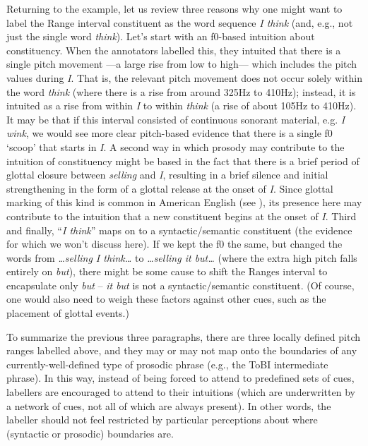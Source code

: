 \documentclass[11pt, twoside]{memoir}
\def\langtext#1{\textit{#1}}
\begin{document}
Returning to the example, let us review three reasons why one might want to label the Range interval constituent as the word sequence \langtext{I think} (and, e.g., not just the single word \langtext{think}). Let’s start with an f0-based intuition about constituency. When the annotators labelled this, they intuited that there is a single pitch movement —a large rise from low to high— which includes the pitch values during \langtext{I}. That is, the relevant pitch movement does not occur solely within the word \langtext{think} (where there is a rise from around 325Hz to 410Hz); instead, it is intuited as a rise from within \langtext{I} to within \langtext{think} (a rise of about 105Hz to 410Hz). It may be that if this interval consisted of continuous sonorant material, e.g. \langtext{I wink}, we would see more clear pitch-based evidence that there is a single f0 ‘scoop’ that starts in \langtext{I}. A second way in which prosody may contribute to the intuition of constituency might be based in the fact that there is a brief period of glottal closure between \langtext{selling} and \langtext{I}, resulting in a brief silence and initial strengthening in the form of a glottal release at the onset of \langtext{I}. Since glottal marking of this kind is common in American English (see \citealt{dilley-96}), its presence here may contribute to the intuition that a new constituent begins at the onset of \langtext{I}. Third and finally, “\langtext{I think}” maps on to a syntactic\slash semantic constituent (the evidence for which we won’t discuss here). If we kept the f0 the same, but changed the words from \langtext{…selling I think…} to \langtext{…selling it but…} (where the extra high pitch falls entirely on \langtext{but}), there might be some cause to shift the Ranges interval to encapsulate only \langtext{but} – \langtext{it but} is not a syntactic\slash semantic constituent. (Of course, one would also need to weigh these factors against other cues, such as the placement of glottal events.)

To summarize the previous three paragraphs, there are three locally defined pitch ranges labelled above, and they may or may not map onto the boundaries of any currently-well-defined type of prosodic phrase (e.g., the ToBI intermediate phrase). In this way, instead of being forced to attend to predefined sets of cues, labellers are encouraged to attend to their intuitions (which are underwritten by a network of cues, not all of which are always present). In other words, the labeller should not feel restricted by particular perceptions about where (syntactic or prosodic) boundaries are.
\end{document}

